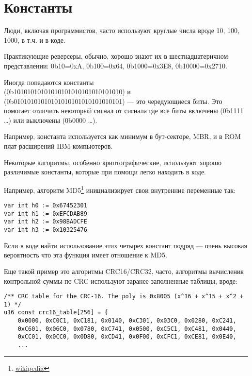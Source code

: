 \section{Константы}

Люди, включая программистов, часто используют круглые числа вроде 10, 100, 1000, в т.ч. и в коде.

Практикующие реверсеры, обычно, хорошо знают их в шестнадцатеричном представлении:
0b10=0xA, 0b100=0x64, 0b1000=0x3E8, 0b10000=0x2710.

Иногда попадаются константы  \\
(0b10101010101010101010101010101010) и
 (0b01010101010101010101010101010101) --- это чередующиеся биты.
Это помогает отличить некоторый сигнал от сигнала где все биты включены (0b1111 \dots) или выключены (0b0000 \dots).

Например, константа  используется как минимум в бут-секторе, \ac{MBR}, 
и в \ac{ROM} плат-расширений IBM-компьютеров.

Некоторые алгоритмы, особенно криптографические, используют хорошо различимые константы, 
которые при помощи \IDA легко находить в коде.

\newcommand{\URLMD}{http://go.yurichev.com/17110}

Например, алгоритм MD5\footnote{\href{\URLMD}{wikipedia}} инициализирует свои внутренние переменные так:

\begin{verbatim}
var int h0 := 0x67452301
var int h1 := 0xEFCDAB89
var int h2 := 0x98BADCFE
var int h3 := 0x10325476
\end{verbatim}

Если в коде найти использование этих четырех констант подряд --- очень высокая вероятность что эта функция имеет отношение к MD5.

\par
Еще такой пример это алгоритмы CRC16/CRC32, часто, алгоритмы вычисления контрольной суммы по CRC 
используют заранее заполненные таблицы, вроде:

\begin{lstlisting}[caption=linux/lib/crc16.c]
/** CRC table for the CRC-16. The poly is 0x8005 (x^16 + x^15 + x^2 + 1) */
u16 const crc16_table[256] = {
	0x0000, 0xC0C1, 0xC181, 0x0140, 0xC301, 0x03C0, 0x0280, 0xC241,
	0xC601, 0x06C0, 0x0780, 0xC741, 0x0500, 0xC5C1, 0xC481, 0x0440,
	0xCC01, 0x0CC0, 0x0D80, 0xCD41, 0x0F00, 0xCFC1, 0xCE81, 0x0E40,
	...
\end{lstlisting}

